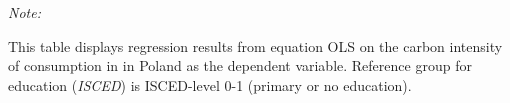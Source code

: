 \begin{table}[htbp!]
\begin{adjustbox}{width = 1\textwidth, max height = 0.95\textheight, center}
\begin{threeparttable}[b]
         \begin{tablenotes}\item \medskip \textit{Note:}
            \item This table displays regression results from equation OLS on the carbon intensity of consumption in  in Poland as the dependent variable. Reference group for education (\textit{ISCED}) is ISCED-level 0-1 (primary or no education).
         \end{tablenotes}
      \end{threeparttable}
   \end{adjustbox}
\end{table}


